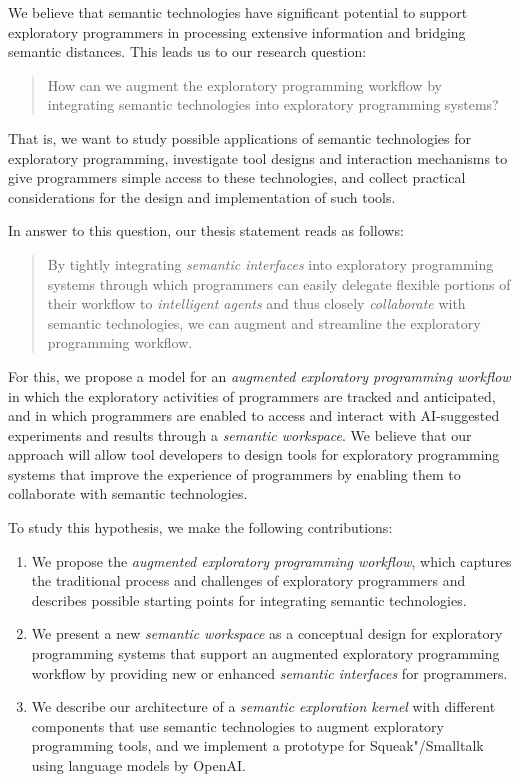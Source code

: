 We believe that semantic technologies have significant potential to support exploratory programmers in processing extensive information and bridging semantic distances.
This leads us to our research question:
%
\begin{quote}
	How can we augment the exploratory programming workflow by integrating semantic technologies into exploratory programming systems?
\end{quote}

That is, we want to study possible applications of semantic technologies for exploratory programming, investigate tool designs and interaction mechanisms to give programmers simple access to these technologies, and collect practical considerations for the design and implementation of such tools.

In answer to this question, our thesis statement reads as follows:
%
\begin{quote}
	By tightly integrating \emph{semantic interfaces} into exploratory programming systems through which programmers can easily delegate flexible portions of their workflow to \emph{intelligent agents} and thus closely \emph{collaborate} with semantic technologies, we can augment and streamline the exploratory programming workflow.
\end{quote}

For this, we propose a model for an \emph{augmented exploratory programming workflow} in which the exploratory activities of programmers are tracked and anticipated, and in which programmers are enabled to access and interact with AI-suggested experiments and results through a \emph{semantic workspace}.
We believe that our approach will allow tool developers to design tools for exploratory programming systems that improve the experience of programmers by enabling them to collaborate with semantic technologies.

To study this hypothesis, we make the following contributions:
%
\begin{enumerate}%
	\item We propose the \emph{augmented exploratory programming workflow}, which captures the traditional process and challenges of exploratory programmers and describes possible starting points for integrating semantic technologies.
	\item We present a new \emph{semantic workspace} as a conceptual design for exploratory programming systems that support an augmented exploratory programming workflow by providing new or enhanced \emph{semantic interfaces} for programmers.
	\item We describe our architecture of a \emph{semantic exploration kernel} with different components that use semantic technologies to augment exploratory programming tools, and we implement a prototype for Squeak"/Smalltalk using language models by OpenAI.
\end{enumerate}

